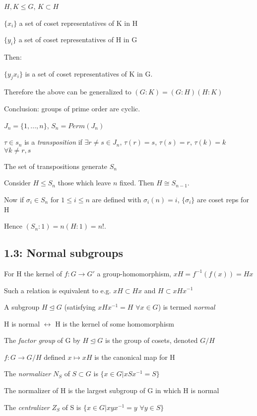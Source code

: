 \documentclass[12pt]{article}
\begin{document}
$H, K \leq G$, $K \subset H$

$\{x_i\}$ a set of coset representatives of K in H

$\{y_i\}$ a set of coset representatives of H in G

\noindent
Then:

$\{y_jx_i\}$ is a set of coset representatives of K in G.

\noindent
Therefore the above can be generalized to $(G : K) = (G : H)(H : K)$

\noindent
Conclusion: groups of prime order are cyclic.

\noindent
$J_n = \{1, ... , n\}$, $S_n = Perm(J_n)$

$\tau \in s_n$ is a \textit{transposition} if $\exists r \neq s \in J_n$, $\tau(r) = s$, $\tau(s) = r$, $\tau(k) = k$ $\forall k \neq r, s$

The set of transpositions generate $S_n$

Consider $H \leq S_n$ those which leave $n$ fixed. Then $H \cong S_{n-1}$.

Now if $\sigma_i \in S_n$ for $1 \leq i \leq n$ are defined with $\sigma_i(n) = i$, $\{\sigma_i\}$ are coset reps for H

Hence $(S_n : 1) = n(H : 1) = n!$. 

\subsection{1.3: Normal subgroups}

\noindent
For H the kernel of $f: G \to G'$ a group-homomorphism, $xH = f^{-1}(f(x)) = Hx$

Such a relation is equivalent to e.g. $xH \subset Hx$ and $H \subset xHx^{-1}$

A subgroup $H \trianglelefteq G$ (satisfying $xHx^{-1} = H$ $\forall x \in G$) is termed \textit{normal}

H is normal $\leftrightarrow$ H is the kernel of some homomorphism

\noindent
The \textit{factor group} of G by $H \trianglelefteq G$ is the group of cosets, denoted $G\slash H$

$f: G \to G\slash H$ defined $x \mapsto xH$ is the canonical map for H

\noindent
The \textit{normalizer} $N_S$ of $S \subset G$ is $\{x \in G | xSx^{-1} = S \}$

The normalizer of H is the largest subgroup of G in which H is normal

\noindent
The \textit{centralizer} $Z_S$ of S is $\{x \in G|xyx^{-1} = y$ $\forall y \in S\}$
\end{document}
